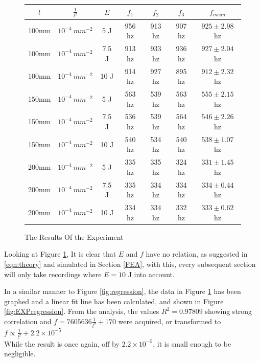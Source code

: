 \documentclass[a4paper,12pt]{article}
\begin{document}
    \begin{figure}[H]%
    \begin{center}
    \begin{tabular}[H]{|c|c|c||c|c|c|c|}
    \hline
    $l$ & $\frac{1}{l^2}$ & $E$ & $f_1$ & $f_2$ & $f_3$ & $f_{mean}$  \\
    \hline\hline
    100mm & $10^{-4}~mm^{-2}$ & 5 J & 956 hz & 913 hz & 907 hz & $925\pm2.98$ hz \\
    \hline
    100mm & $10^{-4}~mm^{-2}$ & 7.5 J & 913 hz & 933 hz & 936 hz & $927\pm2.04$ hz \\
    \hline
    100mm & $10^{-4}~mm^{-2}$ & 10 J & 914 hz & 927 hz & 895 hz &$912\pm2.32$ hz \\
    \hline
    150mm & $10^{-4}~mm^{-2}$ & 5 J & 563 hz & 539 hz & 563 hz &$555\pm2.15$ hz \\
    \hline
    150mm & $10^{-4}~mm^{-2}$ & 7.5 J & 536 hz & 539 hz & 564 hz &$546\pm2.26$ hz \\
    \hline
    150mm & $10^{-4}~mm^{-2}$ & 10 J & 540 hz & 534 hz & 540 hz &$538\pm1.07$ hz \\
    \hline
    200mm & $10^{-4}~mm^{-2}$ & 5 J & 335 hz & 335 hz & 324 hz &$331\pm1.45$ hz \\
    \hline
    200mm & $10^{-4}~mm^{-2}$ & 7.5 J & 335 hz & 334 hz & 334 hz &$334\pm0.44$ hz \\
    \hline
    200mm & $10^{-4}~mm^{-2}$ & 10 J & 334 hz & 334 hz & 332 hz &$333\pm0.62$ hz \\
    \hline
    \end{tabular}
    \end{center}
    \caption{The Results Of the Experiment}\label{fig:TableResults}
    \end{figure}
    Looking at Figure \ref{fig:TableResults}, It is clear that $E$ and $f$ have no relation, as suggested in \eqref{eqn:theory} and simulated in Section \ref{FEA}, with this, every subsequent section will only take recordings where $E=10$ J into account.

    In a similar manner to Figure \ref{fig:regression}, the data in Figure \ref{fig:TableResults} has been graphed and a linear fit line has been calculated, and shown in Figure \ref{fig:EXPregression}.
    From the analysis, the values $R^2=0.97809$ showing strong correlation and $f=7605636\frac{1}{l^{2}}+170$ were acquired, or transformed to $f\propto\frac{1}{l^{2}}+2.2\times10^{-5}$\\
    While the result is once again, off by $2.2\times10^{-5}$, it is small enough to be negligible.
\end{document}
